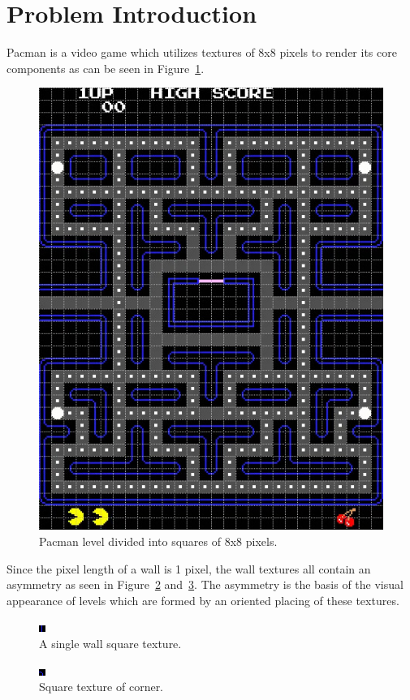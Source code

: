 \section{Problem Introduction}
Pacman is a video game which utilizes textures of 8x8 pixels to render its core components as can be seen in Figure~\ref{PacmanLevelGrid}. 

\begin{figure}[H]
\centering
\includegraphics[width=0.4\linewidth]{Image-1.jpg}
\caption {Pacman level divided into squares of 8x8 pixels.\autocite{pittman_pac-man_2009}}\label{PacmanLevelGrid}
\end{figure}

Since the pixel length of a wall is 1 pixel, the wall textures all contain an asymmetry as seen in Figure~\ref{StraightWallTexture} and~\ref{CornerTexture}. The asymmetry is the basis of the visual appearance of levels which are formed by an oriented placing of these textures. 

\begin{figure}[H]
\centering
\includegraphics[width=0.4\linewidth]{Image-2.png}
\caption {A single wall square texture.\autocite{myself}}\label{StraightWallTexture}
\end{figure}

\begin{figure}[H]
\centering
\includegraphics[width=0.4\linewidth]{Image-3.png}
\caption {Square texture of corner.\autocite{myself}}\label{CornerTexture}
\end{figure}

